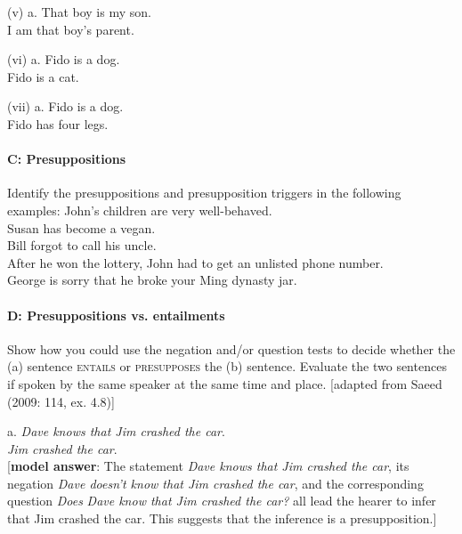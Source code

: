 \begin{stylepoints}
(v)  a. That boy is my son.\\
\ex I am that boy’s parent.
\end{stylepoints}

\begin{stylepoints}
(vi)  a. Fido is a dog.\\
\ex Fido is a cat.
\end{stylepoints}

\begin{stylepoints}
(vii)  a. Fido is a dog.\\
\ex Fido has four legs.
\end{stylepoints}

\paragraph{C: Presuppositions}

Identify the presuppositions and presupposition triggers in the following examples:
\ea
\ea
 John’s children are very well-behaved.\\
\ex Susan has become a vegan.\\
\ex Bill forgot to call his uncle.\\
\ex After he won the lottery, John had to get an unlisted phone number.\\
\ex George is sorry that he broke your Ming dynasty jar.
\z
\z

\paragraph{D: Presuppositions vs. entailments}

Show how you could use the negation and/or question tests to decide whether the (a) sentence \textsc{entails} or \textsc{presupposes} the (b) sentence. Evaluate the two sentences if spoken by the same speaker at the same time and place. [adapted from Saeed (2009: 114, ex. 4.8)]

\begin{stylepoints}
\ea%
    \label{ex:key:1}

          a. \textit{Dave knows that Jim crashed the car}.\\
\ex \textit{Jim crashed the car}.\\
{}[\textbf{model answer}: The statement \textit{Dave knows that Jim crashed the car}, its negation \textit{Dave doesn’t know that Jim crashed the car}, and the corresponding question \textit{Does} \textit{Dave know that Jim crashed the car?} all lead the hearer to infer that Jim crashed the car. This suggests that the inference is a presupposition.]
\z
\end{stylepoints}

